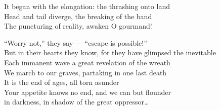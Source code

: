It began with the elongation: the thrashing onto land\\
Head and tail diverge, the breaking of the band\\
The puncturing of reality, awaken O gourmand!

``Worry not,'' they say — ``escape is possible!''\\
But in their hearts they know, for they have glimpsed the inevitable\\
Each immanent wave a great revelation of the wreath\\
We march to our graves, partaking in one last death\\

It is the end of ages, all torn asunder\\
Your appetite knows no end, and we can but flounder\\
in darkness, in shadow of the great oppressor…